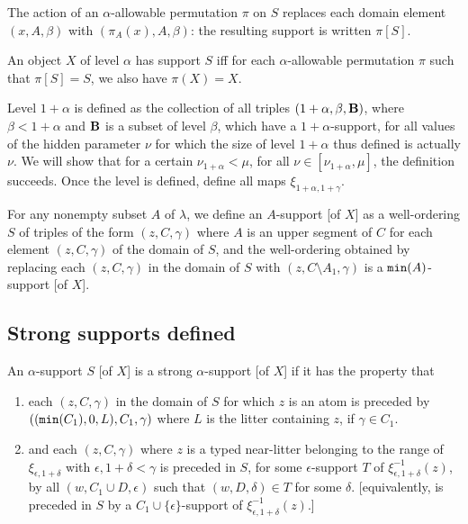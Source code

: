 \documentclass[12pt]{article}
\begin{document}
The action of an $\alpha$-allowable permutation $\pi$ on $S$ replaces each domain element  $(x,A,\beta)$ with $(\pi_A(x),A,\beta)$:  the resulting support is written $\pi[S]$.

An object $X$ of level $\alpha$ has support $S$ iff for each $\alpha$-allowable permutation $\pi$ such that $\pi[S]=S$, we also have $\pi(X)=X$.

Level $1+\alpha$ is defined as the collection of all triples $(1+\alpha,\beta,{\bf B})$, where $\beta<1+\alpha$ and ${\bf B}$ is a subset of level $\beta$, which have a $1+\alpha$-support, for all values of the hidden
parameter $\nu$ for which the size of level $1+\alpha$ thus defined is actually $\nu$.  We will show that for a certain $\nu_{1+\alpha}<\mu$, for all $\nu \in [\nu_{1+\alpha},\mu]$, the definition succeeds.  Once the level is defined, define all maps $\xi_{1+\alpha,1+\gamma}$.

For any nonempty subset $A$ of $\lambda$, we define an $A$-support [of $X$] as a well-ordering $S$ of triples of the form $(z,C,\gamma)$  where $A$ is an upper segment of $C$ for each element $(z,C,\gamma)$ of the domain of $S$, and the
well-ordering obtained by replacing each $(z,C,\gamma)$ in the domain of $S$ with $(z,C \setminus A_1,\gamma)$ is
a ${\tt min}(A)$-support [of $X$].

\subsection{Strong supports defined}

An $\alpha$-support $S$ [of $X$] is a strong $\alpha$-support [of $X$] if it has the property that 

\begin{enumerate}

\item each $(z,C,\gamma)$ in the domain of $S$ for which $z$ is
an atom is preceded by $(({\tt min}(C_1),0,L),C_1,\gamma)$ where $L$ is the litter containing $z$,  if $\gamma \in C_1$.

\item and each $(z,C,\gamma)$ where $z$ is a typed near-litter belonging to the range of $\xi_{\epsilon,1+\delta}$
with $\epsilon, 1+\delta<\gamma$ is preceded in $S$, for some $\epsilon$-support $T$ of $\xi_{\epsilon,1+\delta}^{-1}(z)$, by all $(w,C_1 \cup D,\epsilon)$ such that $(w,D,\delta) \in T$ for some $\delta$.  [equivalently, is preceded in $S$ by a $C_1 \cup \{\epsilon\}$-support of $\xi_{\epsilon,1+\delta}^{-1}(z)$.]

\end{enumerate}
\end{document}
